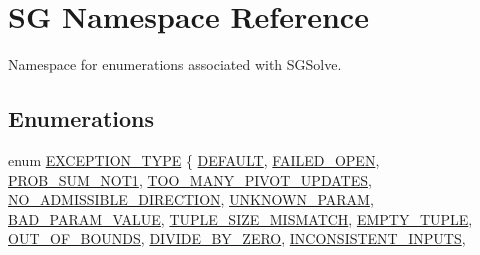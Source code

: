 \hypertarget{namespaceSG}{}\section{SG Namespace Reference}
\label{namespaceSG}


Namespace for enumerations associated with S\+G\+Solve.  


\subsection*{Enumerations}
\begin{DoxyCompactItemize}
\item 
enum \hyperlink{namespaceSG_a671df7c720746d1e853deee02bad6411}{E\+X\+C\+E\+P\+T\+I\+O\+N\+\_\+\+T\+Y\+PE} \{ \newline
\hyperlink{namespaceSG_a671df7c720746d1e853deee02bad6411a0c0f6f82ce3e38637b36fdf4fe34d79f}{D\+E\+F\+A\+U\+LT}, 
\hyperlink{namespaceSG_a671df7c720746d1e853deee02bad6411a21d046b1a7aaafe81df43a31907763df}{F\+A\+I\+L\+E\+D\+\_\+\+O\+P\+EN}, 
\hyperlink{namespaceSG_a671df7c720746d1e853deee02bad6411a7b52523b2b62c50acefdda8cc48cc567}{P\+R\+O\+B\+\_\+\+S\+U\+M\+\_\+\+N\+O\+T1}, 
\hyperlink{namespaceSG_a671df7c720746d1e853deee02bad6411a6367fa4c159947c601eefe03b9a4744a}{T\+O\+O\+\_\+\+M\+A\+N\+Y\+\_\+\+P\+I\+V\+O\+T\+\_\+\+U\+P\+D\+A\+T\+ES}, 
\newline
\hyperlink{namespaceSG_a671df7c720746d1e853deee02bad6411a58592fb7e538a742e239471846a5aa36}{N\+O\+\_\+\+A\+D\+M\+I\+S\+S\+I\+B\+L\+E\+\_\+\+D\+I\+R\+E\+C\+T\+I\+ON}, 
\hyperlink{namespaceSG_a671df7c720746d1e853deee02bad6411ad7b0833979051cdee19d56bb3f2eee25}{U\+N\+K\+N\+O\+W\+N\+\_\+\+P\+A\+R\+AM}, 
\hyperlink{namespaceSG_a671df7c720746d1e853deee02bad6411a351f10cb2be1b989798b4e099850770c}{B\+A\+D\+\_\+\+P\+A\+R\+A\+M\+\_\+\+V\+A\+L\+UE}, 
\hyperlink{namespaceSG_a671df7c720746d1e853deee02bad6411ac53b0a487456cc05a7989ce3bc609014}{T\+U\+P\+L\+E\+\_\+\+S\+I\+Z\+E\+\_\+\+M\+I\+S\+M\+A\+T\+CH}, 
\newline
\hyperlink{namespaceSG_a671df7c720746d1e853deee02bad6411a1d39f5d72e033fb69df933a8540456b2}{E\+M\+P\+T\+Y\+\_\+\+T\+U\+P\+LE}, 
\hyperlink{namespaceSG_a671df7c720746d1e853deee02bad6411a2e57419902a3e0e5423a103a24d09358}{O\+U\+T\+\_\+\+O\+F\+\_\+\+B\+O\+U\+N\+DS}, 
\hyperlink{namespaceSG_a671df7c720746d1e853deee02bad6411ad835b5c738cb9963c11dc8f19c9122a4}{D\+I\+V\+I\+D\+E\+\_\+\+B\+Y\+\_\+\+Z\+E\+RO}, 
\hyperlink{namespaceSG_a671df7c720746d1e853deee02bad6411afc1e024e13da4e1540493655ed3102f9}{I\+N\+C\+O\+N\+S\+I\+S\+T\+E\+N\+T\+\_\+\+I\+N\+P\+U\+TS}, 

\end{DoxyCompactItemize}
